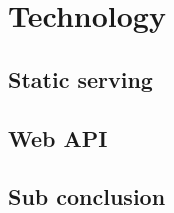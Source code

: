 \chapter{Technology}
\label{chap:Technology}

\section{Static serving}
\label{sec:Static serving}

\section{Web API}
\label{sec:Web API}

\section{Sub conclusion}
\label{sec:Sub conclusion}
